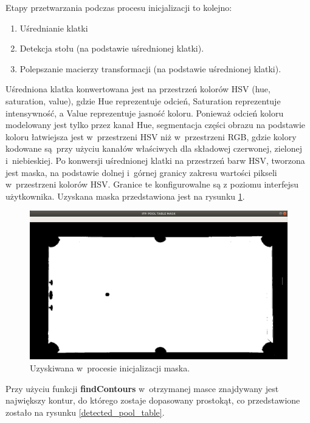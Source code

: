 \documentclass[12pt]{article}
\begin{document}
Etapy przetwarzania podczas procesu inicjalizacji to kolejno:
    \begin{enumerate} [noitemsep]
        \item Uśrednianie klatki
        \item Detekcja stołu (na podstawie uśrednionej klatki).
        \item Polepszanie macierzy transformacji (na podstawie uśrednionej klatki).
    \end{enumerate}
    
    Uśredniona klatka konwertowana jest na przestrzeń kolorów HSV (hue, saturation, value), gdzie Hue reprezentuje odcień, Saturation reprezentuje intensywność, a Value reprezentuje jasność koloru. Ponieważ odcień koloru modelowany jest tylko przez kanał Hue, segmentacja części obrazu na podstawie koloru łatwiejsza jest w~przestrzeni HSV niż w~przestrzeni RGB, gdzie kolory kodowane są przy użyciu kanałów właściwych dla składowej czerwonej, zielonej i~niebieskiej.
    Po konwersji uśrednionej klatki na przestrzeń barw HSV, tworzona jest maska, na podstawie dolnej i~górnej granicy zakresu wartości pikseli w~przestrzeni kolorów HSV. Granice te konfigurowalne są z poziomu interfejsu użytkownika. Uzyskana maska przedstawiona jest na rysunku \ref{pool_table_mask}.

    \begin{figure}[!htb]
        \centering
        \includegraphics[width=15cm]{./images/obrazki/inicjalizacja/pool_table_mask.png}
        \caption{Uzyskiwana w~procesie inicjalizacji maska.}
        \label{pool_table_mask}
    \end{figure}


        Przy użyciu funkcji \textbf{findContours}\cite{FindContours} w~otrzymanej masce znajdywany jest największy kontur, do którego zostaje dopasowany prostokąt, co przedstawione zostało na rysunku \ref{detected_pool_table}.
\end{document}

